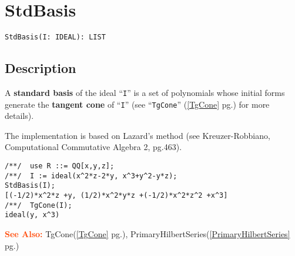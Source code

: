 \documentclass[a4paper]{mybook}
\newenvironment{command}{}{} %
\newcommand\SeeAlso{\par\textcolor{OrangeRed}{\textbf{\large See Also: }}}
\begin{document}
\section{StdBasis}
\label{StdBasis}
\begin{command} %


\begin{Verbatim}[label=syntax, rulecolor=\color{MidnightBlue},
frame=single]
StdBasis(I: IDEAL): LIST
\end{Verbatim}


\subsection*{Description}

A \textbf{standard basis} of the ideal ``\verb&I&'' is a set of polynomials
whose initial forms generate the \textbf{tangent cone} of ``\verb&I&''
(see ``\verb&TgCone&'' (\ref{TgCone} pg.\pageref{TgCone}) for more details).
\par 
The implementation is based on Lazard's method 
(see Kreuzer-Robbiano, Computational Commutative Algebra 2, pg.463).
\begin{Verbatim}[label=example, rulecolor=\color{PineGreen}, frame=single]
/**/  use R ::= QQ[x,y,z];
/**/  I := ideal(x^2*z-2*y, x^3+y^2-y*z);
StdBasis(I);
[(-1/2)*x^2*z +y, (1/2)*x^2*y*z +(-1/2)*x^2*z^2 +x^3]
/**/  TgCone(I);
ideal(y, x^3)
\end{Verbatim}


\SeeAlso %
  TgCone(\ref{TgCone} pg.\pageref{TgCone}), 
    PrimaryHilbertSeries(\ref{PrimaryHilbertSeries} pg.\pageref{PrimaryHilbertSeries})
\end{command} %
\end{document}
